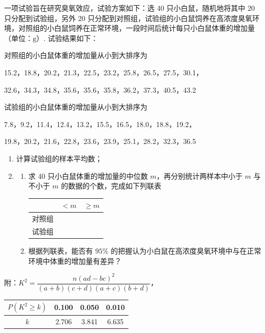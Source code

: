 \begin{problem}
一项试验旨在研究臭氧效应，试验方案如下：选 40 只小白鼠，随机地将其中 20 只分配到试验组，另外 20 只分配到对照组，试验组的小白鼠饲养在高浓度臭氧环境，对照组的小白鼠饲养在正常环境，一段时间后统计每只小白鼠体重的增加量（单位：\(\mathrm{g}\)）. 试验结果如下：

对照组的小白鼠体重的增加量从小到大排序为

15.2，18.8，20.2，21.3，22.5，23.2，25.8，26.5，27.5，30.1，

32.6，34.3，34.8，35.6，35.6，35.8，36.2，37.3，40.5，43.2

试验组的小白鼠体重的增加量从小到大排序为

7.8，9.2，11.4，12.4，13.2，15.5，16.5，18.0，18.8，19.2，

19.8，20.2，21.6，22.8，23.6，23.9，25.1，28.2，32.3，36.5
\begin{enumerate}
\item 计算试验组的样本平均数；
\item
\begin{enumerate}
\item 求 40 只小白鼠体重的增加量的中位数 \(m\)，再分别统计两样本中小于 \(m\) 与不小于 \(m\) 的数据的个数，完成如下列联表
\begin{center}
\begin{tabular}{|c|c|c|}
\hline
& \(<m\) & \(\ge m\) \\
\hline
对照组 &  &  \\
\hline
试验组 &  &  \\
\hline
\end{tabular}
\end{center}
\item 根据列联表，能否有 \(95\%\) 的把握认为小白鼠在高浓度臭氧环境中与在正常环境中体重的增加量有差异？
\end{enumerate}
\end{enumerate}

附：\(K^2=\dfrac{n\left(ad-bc\right)^2}{\left(a+b\right)\left(c+d\right)\left(a+c\right)\left(b+d\right)}\)，

\begin{center}
\begin{tabular}{c|ccc}
\hline
\(P\left(K^2\ge k\right)\) & 0.100 & 0.050 & 0.010 \\
\hline
\(k\) & 2.706 & 3.841 & 6.635 \\
\hline
\end{tabular}
\end{center}
\end{problem}

